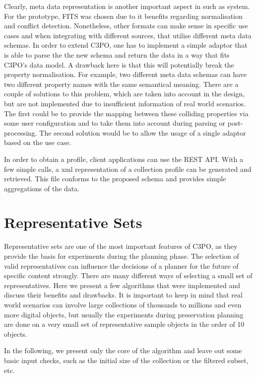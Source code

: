 Clearly, meta data representation is another important aspect in such as system. For the prototype, FITS was chosen due to it benefits regarding normalisation and conflict detection. Nonetheless, other formats can make sense in specific use cases and when integrating with different sources, that utilise different meta data schemas. In order to extend C3PO, one has to implement a simple adaptor that is able to parse the the new schema and return the data in a way that fits C3PO's data model. A drawback here is that this will potentially break the property normalisation. For example, two different meta data schemas can have two different property names with the same semantical meaning. There are a couple of solutions to this problem, which are taken into account in the design, but are not implemented due to insufficient information of real world scenarios. The first could be to provide the mapping between these colliding properties via some user configuration and to take them into account during parsing or post-processing. The second solution would be to allow the usage of a single adaptor based on the use case.

In order to obtain a profile, client applications can use the REST API. With a few simple calls, a xml representation of a collection profile can be generated and retrieved. This file conforms to the proposed schema and provides simple aggregations of the data.
 
\section{Representative Sets}
Representative sets are one of the most important features of C3PO, as they provide the basis for experiments during the planning phase. The selection of valid representatives can influence the decisions of a planner for the future of specific content strongly. There are many different ways of selecting a small set of representatives.
Here we present a few algorithms that were implemented and discuss their benefits and drawbacks. It is important to keep in mind that real world scenarios can involve large collections of thousands to millions and even more digital objects, but usually the experiments during preservation planning are done on a very small set of representative sample objects in the order of 10 objects.

In the following, we present only the core of the algorithm and leave out some basic input checks, such as the initial size of the collection or the filtered subset, etc.

